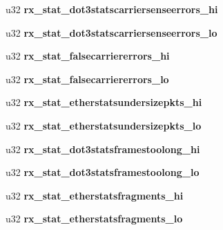 \begin{DoxyCompactItemize}
\item 
\hypertarget{structmac__stx_abc9848fac5f9044238af8399db067f7d}{
u32 {\bfseries rx\_\-stat\_\-dot3statscarriersenseerrors\_\-hi}}
\label{structmac__stx_abc9848fac5f9044238af8399db067f7d}

\item 
\hypertarget{structmac__stx_a8193025d67e75139dc7b294fa68336e7}{
u32 {\bfseries rx\_\-stat\_\-dot3statscarriersenseerrors\_\-lo}}
\label{structmac__stx_a8193025d67e75139dc7b294fa68336e7}

\item 
\hypertarget{structmac__stx_af7bc963c2f0fa1b28aadf73c4699b00e}{
u32 {\bfseries rx\_\-stat\_\-falsecarriererrors\_\-hi}}
\label{structmac__stx_af7bc963c2f0fa1b28aadf73c4699b00e}

\item 
\hypertarget{structmac__stx_a807efe3bcb553136e3202c85b2c79c01}{
u32 {\bfseries rx\_\-stat\_\-falsecarriererrors\_\-lo}}
\label{structmac__stx_a807efe3bcb553136e3202c85b2c79c01}

\item 
\hypertarget{structmac__stx_a1d7505f8d75676bb525a8cc6b8b27768}{
u32 {\bfseries rx\_\-stat\_\-etherstatsundersizepkts\_\-hi}}
\label{structmac__stx_a1d7505f8d75676bb525a8cc6b8b27768}

\item 
\hypertarget{structmac__stx_a7d3d7849cfae85bf672b442937981a5e}{
u32 {\bfseries rx\_\-stat\_\-etherstatsundersizepkts\_\-lo}}
\label{structmac__stx_a7d3d7849cfae85bf672b442937981a5e}

\item 
\hypertarget{structmac__stx_aa92d837de9cd8f5250d380799a41077f}{
u32 {\bfseries rx\_\-stat\_\-dot3statsframestoolong\_\-hi}}
\label{structmac__stx_aa92d837de9cd8f5250d380799a41077f}

\item 
\hypertarget{structmac__stx_a52cc6cf0edb96323af7d4dc11c46df8c}{
u32 {\bfseries rx\_\-stat\_\-dot3statsframestoolong\_\-lo}}
\label{structmac__stx_a52cc6cf0edb96323af7d4dc11c46df8c}

\item 
\hypertarget{structmac__stx_a262c847f81476f21127650a64f6da7ef}{
u32 {\bfseries rx\_\-stat\_\-etherstatsfragments\_\-hi}}
\label{structmac__stx_a262c847f81476f21127650a64f6da7ef}

\item 
\hypertarget{structmac__stx_a5ef55bb516e0aecf11a610e28b626853}{
u32 {\bfseries rx\_\-stat\_\-etherstatsfragments\_\-lo}}
\label{structmac__stx_a5ef55bb516e0aecf11a610e28b626853}


\end{DoxyCompactItemize}
